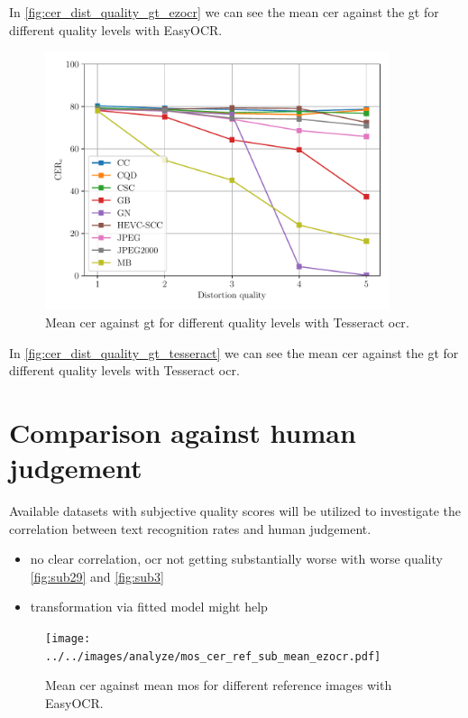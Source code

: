 In \autoref{fig:cer_dist_quality_gt_ezocr} we can see the mean \gls{cer} against the gt for different quality levels with EasyOCR.

\begin{figure}[h]
\centering
    \includegraphics[width=0.9\textwidth]{../../images/analyze/cer_dist_quality_gt_tess.pdf}
    \caption{Mean \gls{cer} against gt for different quality levels with Tesseract \gls{ocr}.}
\label{fig:cer_dist_quality_gt_tesseract}
\end{figure}

In \autoref{fig:cer_dist_quality_gt_tesseract} we can see the mean \gls{cer} against the gt for different quality levels with Tesseract \gls{ocr}.

\section{Comparison against human judgement}
\label{sec:comparison_against_human_judgement}

Available datasets with subjective quality scores will be utilized to investigate
the correlation between text recognition rates and human judgement.

\begin{itemize}
\item no clear correlation, ocr not getting substantially worse with worse quality \autoref{fig:sub29} and \autoref{fig:sub3}
\item transformation via fitted model might help
\end{itemize}

\begin{figure}[h]
\centering
    \texttt{[image: ../../images/analyze/mos\_cer\_ref\_sub\_mean\_ezocr.pdf]}
    \caption{Mean \gls{cer} against mean \gls{mos} for different reference images with EasyOCR.}
\label{fig:mos_cer_ref_sub_mean_ezocr}
\end{figure}

